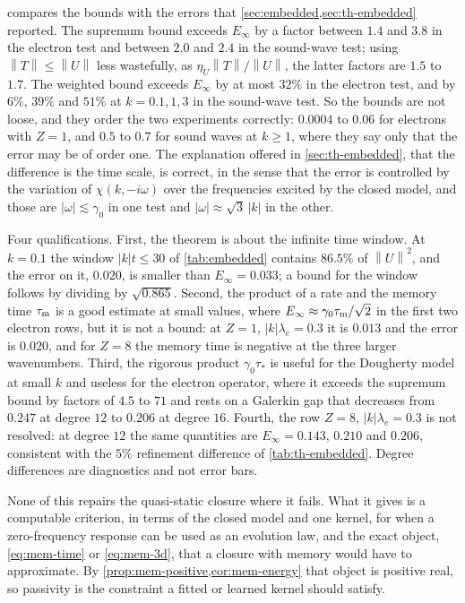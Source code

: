 \documentclass[11pt]{article}
\newcommand{\norm}[1]{\left\|#1\right\|}
\theoremstyle{definition}
\theoremstyle{remark}
\numberwithin{equation}{section}
\begin{document}
 compares the bounds with the errors that
\cref{sec:embedded,sec:th-embedded} reported. The supremum bound exceeds
$E_\infty$ by a factor between $1.4$ and $3.8$ in the electron test and
between $2.0$ and $2.4$ in the sound-wave test; using
$\norm T\leq\norm U$ less wastefully, as $\eta_U\norm T/\norm U$, the
latter factors are $1.5$ to $1.7$. The weighted bound exceeds $E_\infty$
by at most $32\%$ in the electron test, and by $6\%$, $39\%$ and $51\%$
at $k=0.1,1,3$ in the sound-wave test. So the bounds are not loose, and
they order the two experiments correctly: $0.0004$ to $0.06$ for
electrons with $Z=1$, and $0.5$ to $0.7$ for sound waves at $k\geq1$,
where they say only that the error may be of order one. The explanation
offered in \cref{sec:th-embedded}, that the difference is the time scale,
is correct, in the sense that the error is controlled by the variation of
$\chi(k,-i\omega)$ over the frequencies excited by the closed model, and
those are $|\omega|\lesssim\gamma_0$ in one test and
$|\omega|\approx\sqrt3\,|k|$ in the other.

Four qualifications. First, the theorem is about the infinite time
window. At $k=0.1$ the window $|k|t\leq30$ of \cref{tab:embedded} contains
$86.5\%$ of $\norm U^2$, and the error on it, $0.020$, is smaller than
$E_\infty=0.033$; a bound for the window follows by dividing by
$\sqrt{0.865}$. Second, the product of a rate and the memory time
$\tau_{\rm m}$ is a good estimate at small values, where
$E_\infty\approx\gamma_0\tau_{\rm m}/\sqrt2$ in the first two electron
rows, but it is not a bound: at $Z=1$, $|k|\lambda_e=0.3$ it is $0.013$
and the error is $0.020$, and for $Z=8$ the memory time is negative at
the three larger wavenumbers. Third, the rigorous product
$\gamma_0\tau_*$ is useful for the Dougherty model at small $k$ and
useless for the electron operator, where it exceeds the supremum bound by
factors of $4.5$ to $71$ and rests on a Galerkin gap that decreases from
$0.247$ at degree $12$ to $0.206$ at degree $16$. Fourth, the row
$Z=8$, $|k|\lambda_e=0.3$ is not resolved: at degree $12$ the same
quantities are $E_\infty=0.143$, $0.210$ and $0.206$, consistent with the
$5\%$ refinement difference of \cref{tab:th-embedded}. Degree differences
are diagnostics and not error bars.

None of this repairs the quasi-static closure where it fails. What it
gives is a computable criterion, in terms of the closed model and one
kernel, for when a zero-frequency response can be used as an evolution
law, and the exact object, \eqref{eq:mem-time} or \eqref{eq:mem-3d}, that
a closure with memory would have to approximate. By
\cref{prop:mem-positive,cor:mem-energy} that object is positive real, so
passivity is the constraint a fitted or learned kernel should satisfy.
\end{document}
